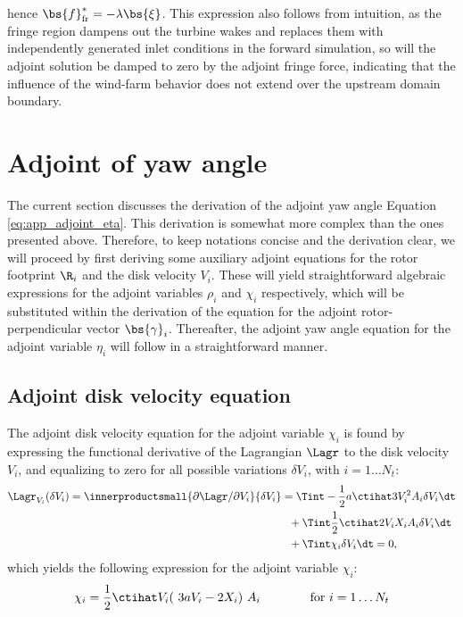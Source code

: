 hence $\bs{f}_{\text{fr}}^* = -\lambda \bs{\xi}$. This expression also follows from intuition, as the fringe region dampens out the turbine wakes and replaces them with independently generated inlet conditions in the forward simulation, so will the adjoint solution be damped to zero by the adjoint fringe force, indicating that the influence of the wind-farm behavior does not extend over the upstream domain boundary. 

\section{Adjoint of yaw angle}
The current section discusses the derivation of the adjoint yaw angle Equation \eqref{eq:app_adjoint_eta}. This derivation is somewhat more complex than the ones presented above. Therefore, to keep notations concise and the derivation clear, we will proceed by first deriving some auxiliary adjoint equations for the rotor footprint $\R_i$ and the disk velocity $V_i$. These will yield straightforward algebraic expressions for the adjoint variables $\rho_i$ and $\chi_i$ respectively, which will be substituted within the derivation of the equation for the adjoint rotor-perpendicular vector $\bs{\gamma}_i$. Thereafter, the adjoint yaw angle equation for the adjoint variable $\eta_i$ will follow in a straightforward manner.



\subsection{Adjoint disk velocity equation}
The adjoint disk velocity equation for the adjoint variable $\chi_i$ is found by expressing the functional derivative of the Lagrangian $\Lagr$ to the disk velocity $V_i$, and equalizing to zero for all possible variations $\delta V_i$, with $i = 1 \dots N_t$: 
\begin{align}
\Lagr_{V_i}(\delta V_i) = \innerproductsmall{\partial \Lagr / \partial V_i}{\delta V_i} &= \Tint -\frac{1}{2} a \ctihat 3 V_i^2 A_i \delta V_i \dt  \nonumber \\
& \ \ + \Tint \frac{1}{2} \ctihat 2 V_i X_i  A_i \delta V_i \dt \nonumber \\
& \ \ + \Tint \chi_i \delta V_i \dt = 0, 
\end{align}
which yields the following expression for the adjoint variable $\chi_i$:
\begin{equation}\label{eq:chi_i}
\chi_i = \frac{1}{2} \ctihat V_i (~3a V_i - 2 X_i )~A_i \qquad\qquad \text{for } i=1\dots N_t 
\end{equation}

